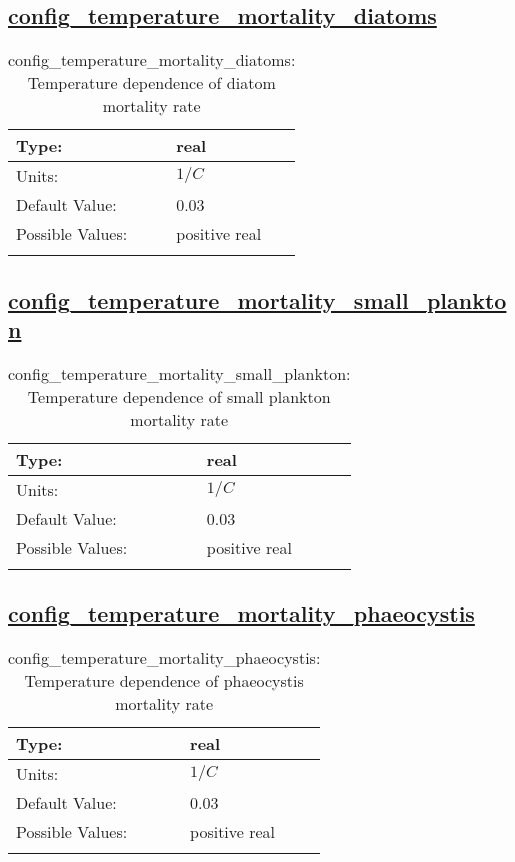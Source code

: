 \subsection[config\_temperature\_mortality\_diatoms]{\hyperref[sec:nm_tab_biogeochemistry]{config\_temperature\_mortality\_diatoms}}
\label{subsec:nm_sec_config_temperature_mortality_diatoms}
\begin{center}
\begin{longtable}{| p{2.0in} || p{4.0in} |}
    \hline
    Type: & real \\
    \hline
    Units: & $1/C$ \\
    \hline
    Default Value: & 0.03 \\
    \hline
    Possible Values: & positive real \\
    \hline
    \caption{config\_temperature\_mortality\_diatoms: Temperature dependence of diatom mortality rate}
\end{longtable}
\end{center}
\subsection[config\_temperature\_mortality\_small\_plankton]{\hyperref[sec:nm_tab_biogeochemistry]{config\_temperature\_mortality\_small\_plankton}}
\label{subsec:nm_sec_config_temperature_mortality_small_plankton}
\begin{center}
\begin{longtable}{| p{2.0in} || p{4.0in} |}
    \hline
    Type: & real \\
    \hline
    Units: & $1/C$ \\
    \hline
    Default Value: & 0.03 \\
    \hline
    Possible Values: & positive real \\
    \hline
    \caption{config\_temperature\_mortality\_small\_plankton: Temperature dependence of small plankton mortality rate}
\end{longtable}
\end{center}
\subsection[config\_temperature\_mortality\_phaeocystis]{\hyperref[sec:nm_tab_biogeochemistry]{config\_temperature\_mortality\_phaeocystis}}
\label{subsec:nm_sec_config_temperature_mortality_phaeocystis}
\begin{center}
\begin{longtable}{| p{2.0in} || p{4.0in} |}
    \hline
    Type: & real \\
    \hline
    Units: & $1/C$ \\
    \hline
    Default Value: & 0.03 \\
    \hline
    Possible Values: & positive real \\
    \hline
    \caption{config\_temperature\_mortality\_phaeocystis: Temperature dependence of phaeocystis mortality rate}
\end{longtable}
\end{center}
